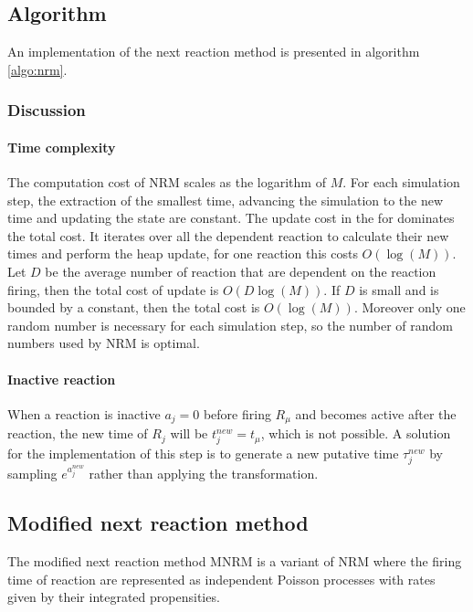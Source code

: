   \subsection{Algorithm}
  An implementation of the next reaction method is presented in algorithm \ref{algo:nrm}.

  

    \subsubsection{Discussion}

      \paragraph{Time complexity}
      The computation cost of NRM scales as the logarithm of $M$.
      For each simulation step, the extraction of the smallest time, advancing the simulation to the new time and updating the state are constant.
      The update cost in the for dominates the total cost.
      It iterates over all the dependent reaction to calculate their new times and perform the heap update, for one reaction this costs $O(\log(M))$.
      Let $D$ be the average number of reaction that are dependent on the reaction firing, then the total cost of update is $O(D\log(M))$.
      If $D$ is small and is bounded by a constant, then the total cost is $O(\log(M))$.
      Moreover only one random number is necessary for each simulation step, so the number of random numbers used by NRM is optimal.

      \paragraph{Inactive reaction}
      When a reaction is inactive $a_j = 0$ before firing $R_\mu$ and becomes active after the reaction, the new time of $R_j$ will be $t_j^{new} = t_\mu$, which is not possible.
      A solution for the implementation of this step is to generate a new putative time $\tau_j^{new}$ by sampling $e^{a_j^{new}}$ rather than applying the transformation.

  \subsection{Modified next reaction method}
  The modified next reaction method MNRM is a variant of NRM where the firing time of reaction are represented as independent Poisson processes with rates given by their integrated propensities.

